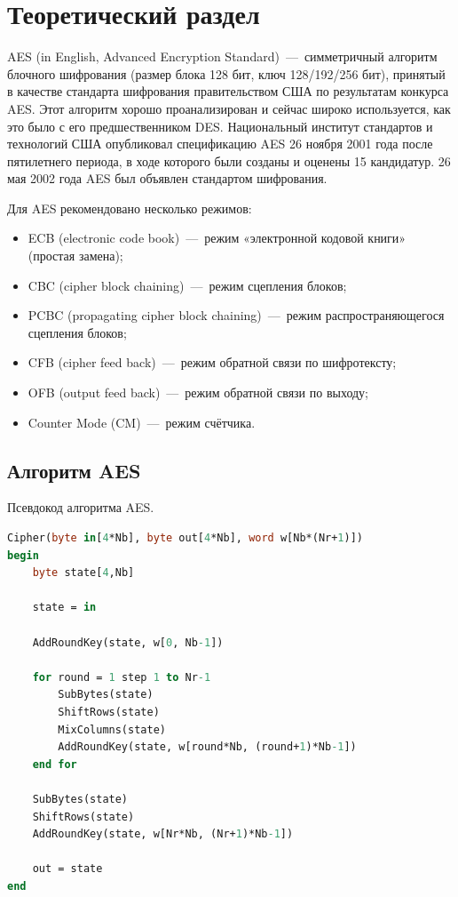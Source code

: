 \chapter{Теоретический раздел}

AES (in English, Advanced Encryption Standard)~---~симметричный алгоритм блочного шифрования (размер блока 128 бит, ключ 128/192/256 бит), принятый в качестве стандарта шифрования правительством США по результатам конкурса AES. Этот алгоритм хорошо проанализирован и сейчас широко используется, как это было с его предшественником DES. Национальный институт стандартов и технологий США опубликовал спецификацию AES 26 ноября 2001 года после пятилетнего периода, в ходе которого были созданы и оценены 15 кандидатур. 26 мая 2002 года AES был объявлен стандартом шифрования.

Для AES рекомендовано несколько режимов:

\begin{itemize}
	\item ECB (electronic code book)~---~режим «электронной кодовой книги» (простая замена);
	\item CBC (cipher block chaining)~---~режим сцепления блоков;
	\item PCBC (propagating cipher block chaining)~---~режим распространяющегося сцепления блоков;
	\item CFB (cipher feed back)~---~режим обратной связи по шифротексту;
	\item OFB (output feed back)~---~режим обратной связи по выходу;
	\item Counter Mode (CM)~---~режим счётчика.
\end{itemize}

\section{Алгоритм AES}

Псевдокод алгоритма AES.

\begin{lstlisting}[language=Pascal, label=lst:pseudoaes, caption={Псевдокод алгоритма AES}]
Cipher(byte in[4*Nb], byte out[4*Nb], word w[Nb*(Nr+1)])
begin
    byte state[4,Nb]
    
    state = in

    AddRoundKey(state, w[0, Nb-1])

    for round = 1 step 1 to Nr-1
        SubBytes(state)
        ShiftRows(state)
        MixColumns(state)
        AddRoundKey(state, w[round*Nb, (round+1)*Nb-1])
    end for

    SubBytes(state)
    ShiftRows(state)
    AddRoundKey(state, w[Nr*Nb, (Nr+1)*Nb-1])

    out = state
end
\end{lstlisting}


